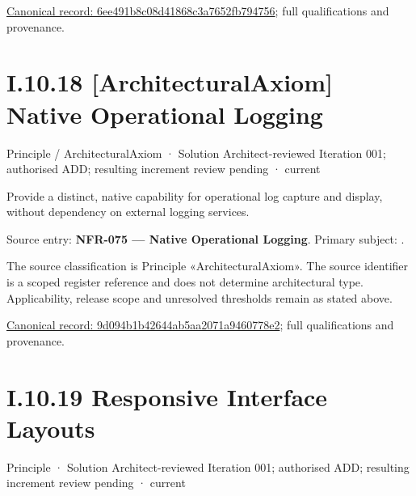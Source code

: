 {\footnotesize \href{../../../../../../../../continuum/motivation/principle/architectural-axiom/6ee491b8c08d41868c3a7652fb794756.md}{Canonical record: 6ee491b8c08d41868c3a7652fb794756}; full qualifications and provenance.}\par
\section*{I.10.18 [ArchitecturalAxiom] Native Operational Logging}
\label{navigation:I.10.18}

\label{element:9d094b1b42644ab5aa2071a9460778e2}
{\small Principle / ArchitecturalAxiom · Solution Architect-reviewed Iteration 001; authorised ADD; resulting increment review pending · current}\par

Provide a distinct, native capability for operational log capture and display, without dependency on external logging services.



Source entry: \textbf{NFR-075 — Native Operational Logging}. Primary subject: \texttt{}.



The source classification is Principle «ArchitecturalAxiom». The source identifier is a scoped register reference and does not determine architectural type. Applicability, release scope and unresolved thresholds remain as stated above.


{\footnotesize \href{../../../../../../../../continuum/motivation/principle/architectural-axiom/9d094b1b42644ab5aa2071a9460778e2.md}{Canonical record: 9d094b1b42644ab5aa2071a9460778e2}; full qualifications and provenance.}\par
\section*{I.10.19 Responsive Interface Layouts}
\label{navigation:I.10.19}

\label{element:2e276eda09a94670bee0619468947895}
{\small Principle · Solution Architect-reviewed Iteration 001; authorised ADD; resulting increment review pending · current}\par


